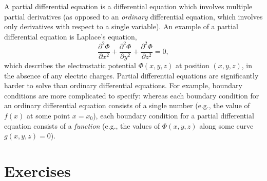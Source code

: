 \documentclass[10pt,a4paper]{article}
\begin{document}
A partial differential equation is a differential equation which
involves multiple partial derivatives (as opposed to an
\emph{ordinary} differential equation, which involves only derivatives
with respect to a single variable). An example of a partial
differential equation is Laplace's equation,
\begin{equation}
\frac{\partial^2 \Phi}{\partial x^2} + \frac{\partial^2 \Phi}{\partial y^2} + \frac{\partial^2 \Phi}{\partial z^2}= 0,
\end{equation}
which describes the electrostatic potential $\Phi(x,y,z)$ at position
$(x,y,z)$, in the absence of any electric charges. Partial
differential equations are significantly harder to solve than ordinary
differential equations. For example, boundary conditions are more
complicated to specify: whereas each boundary condition for an ordinary
differential equation consists of a single number (e.g., the value of
$f(x)$ at some point $x = x_0$), each boundary condition for a
partial differential equation consists of a \emph{function} (e.g., the
values of $\Phi(x,y,z)$ along some curve $g(x,y,z) = 0$).

\section{Exercises}\label{exercises}
\end{document}
